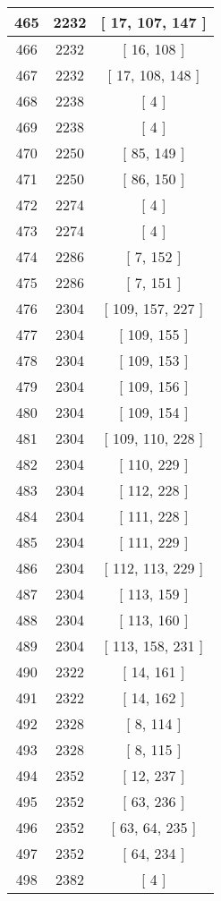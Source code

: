 \begin{center}
\begin{longtable}[H]{|| c c c ||}
\hline
465 & 2232 & [ 17, 107, 147 ] \\ 
\hline
466 & 2232 & [ 16, 108 ] \\ 
\hline
467 & 2232 & [ 17, 108, 148 ] \\ 
\hline
468 & 2238 & [ 4 ] \\ 
\hline
469 & 2238 & [ 4 ] \\ 
\hline
470 & 2250 & [ 85, 149 ] \\ 
\hline
471 & 2250 & [ 86, 150 ] \\ 
\hline
472 & 2274 & [ 4 ] \\ 
\hline
473 & 2274 & [ 4 ] \\ 
\hline
474 & 2286 & [ 7, 152 ] \\ 
\hline
475 & 2286 & [ 7, 151 ] \\ 
\hline
476 & 2304 & [ 109, 157, 227 ] \\ 
\hline
477 & 2304 & [ 109, 155 ] \\ 
\hline
478 & 2304 & [ 109, 153 ] \\ 
\hline
479 & 2304 & [ 109, 156 ] \\ 
\hline
480 & 2304 & [ 109, 154 ] \\ 
\hline
481 & 2304 & [ 109, 110, 228 ] \\ 
\hline
482 & 2304 & [ 110, 229 ] \\ 
\hline
483 & 2304 & [ 112, 228 ] \\ 
\hline
484 & 2304 & [ 111, 228 ] \\ 
\hline
485 & 2304 & [ 111, 229 ] \\ 
\hline
486 & 2304 & [ 112, 113, 229 ] \\ 
\hline
487 & 2304 & [ 113, 159 ] \\ 
\hline
488 & 2304 & [ 113, 160 ] \\ 
\hline
489 & 2304 & [ 113, 158, 231 ] \\ 
\hline
490 & 2322 & [ 14, 161 ] \\ 
\hline
491 & 2322 & [ 14, 162 ] \\ 
\hline
492 & 2328 & [ 8, 114 ] \\ 
\hline
493 & 2328 & [ 8, 115 ] \\ 
\hline
494 & 2352 & [ 12, 237 ] \\ 
\hline
495 & 2352 & [ 63, 236 ] \\ 
\hline
496 & 2352 & [ 63, 64, 235 ] \\ 
\hline
497 & 2352 & [ 64, 234 ] \\ 
\hline
498 & 2382 & [ 4 ] \\ 
\hline

\end{longtable}
\end{center}
